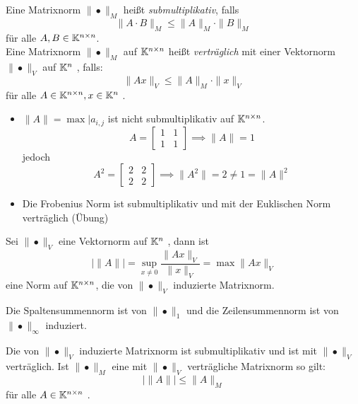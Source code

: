 \begin{definition}
Eine Matrixnorm $\|•\|_M$ heißt \emph{submultiplikativ}, falls 
\[
\|A\cdot B\|_M \le \|A\|_M \cdot \|B\|_M
\]
für alle $A,B \in \mathbb{K}^{n\times n}$.\\
Eine Matrixnorm $\|•\|_M$ auf $\mathbb{K}^{n\times n}$ heißt \emph{verträglich} mit einer Vektornorm $\|•\|_V$  auf $\mathbb{K}^{n}$ , falls:
\[
\|Ax\|_V \le \|A\|_M \cdot \|x\|_V
\]
für alle $A \in \mathbb{K}^{n\times n}, x \in \mathbb{K}^{n}$ .
\end{definition}
\begin{example}
\begin{itemize}
	\item $\|A\|= \max |a_{i,j}$ ist nicht submultiplikativ auf $\mathbb{K}^{n\times n}$.
		\[
		A = \begin{bmatrix}
		 1 & 1 \\ 1 & 1
		\end{bmatrix} \implies \|A\|=1
		\]
		jedoch 
		\[
		A^2= \begin{bmatrix}
			2 & 2 \\ 2 & 2
		\end{bmatrix} \implies \|A^2\|=2 \neq 1 = \|A\|^2
		\]
	\item Die Frobenius Norm ist submultiplikativ und mit der Euklischen Norm verträglich (Übung)
\end{itemize}
\end{example}
\begin{definition}
Sei $\|•\|_V $ eine Vektornorm auf $\mathbb{K}^{n}$ , dann ist 
\[
|\|A\|| = \sup_{x\neq 0} \frac{\|Ax\|_V}{\|x\|_V}= \max \|Ax\|_V
\]
eine Norm auf $\mathbb{K}^{n\times n}$, die von  $\|•\|_V$ induzierte Matrixnorm. 
\end{definition}
\begin{example}
Die Spaltensummennorm ist von $\|•\|_1$ und die Zeilensummennorm ist von $\|•\|_{\infty}$ induziert.
\end{example}
\begin{lemma}
	Die von $\|•\|_V$ induzierte Matrixnorm ist submultiplikativ und ist mit $\|•\|_V$ verträglich. Ist $\|•\|_M$ eine mit $\|•\|_V$ verträgliche Matrixnorm so gilt:
	\[
	|\|A\|| \le \|A\|_M
	\]
	für alle $A \in \mathbb{K}^{n\times n}$ .
\end{lemma}
